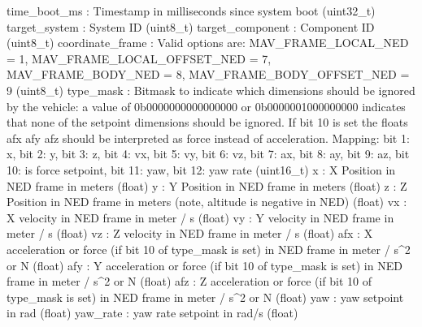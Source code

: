 \begin{DoxyVerb}
\begin{DoxyVerb}
\begin{DoxyVerb}
\begin{DoxyVerb}
\begin{DoxyVerb}
\begin{DoxyVerb}
\begin{DoxyVerb}
\begin{DoxyVerb}
\begin{DoxyVerb}
\begin{DoxyVerb}
\begin{DoxyVerb}
time_boot_ms              : Timestamp in milliseconds since system boot (uint32_t)
target_system             : System ID (uint8_t)
target_component          : Component ID (uint8_t)
coordinate_frame          : Valid options are: MAV_FRAME_LOCAL_NED = 1, MAV_FRAME_LOCAL_OFFSET_NED = 7, MAV_FRAME_BODY_NED = 8, MAV_FRAME_BODY_OFFSET_NED = 9 (uint8_t)
type_mask                 : Bitmask to indicate which dimensions should be ignored by the vehicle: a value of 0b0000000000000000 or 0b0000001000000000 indicates that none of the setpoint dimensions should be ignored. If bit 10 is set the floats afx afy afz should be interpreted as force instead of acceleration. Mapping: bit 1: x, bit 2: y, bit 3: z, bit 4: vx, bit 5: vy, bit 6: vz, bit 7: ax, bit 8: ay, bit 9: az, bit 10: is force setpoint, bit 11: yaw, bit 12: yaw rate (uint16_t)
x                         : X Position in NED frame in meters (float)
y                         : Y Position in NED frame in meters (float)
z                         : Z Position in NED frame in meters (note, altitude is negative in NED) (float)
vx                        : X velocity in NED frame in meter / s (float)
vy                        : Y velocity in NED frame in meter / s (float)
vz                        : Z velocity in NED frame in meter / s (float)
afx                       : X acceleration or force (if bit 10 of type_mask is set) in NED frame in meter / s^2 or N (float)
afy                       : Y acceleration or force (if bit 10 of type_mask is set) in NED frame in meter / s^2 or N (float)
afz                       : Z acceleration or force (if bit 10 of type_mask is set) in NED frame in meter / s^2 or N (float)
yaw                       : yaw setpoint in rad (float)
yaw_rate                  : yaw rate setpoint in rad/s (float)\end{DoxyVerb}
 \mbox{\label{classpymavlink_1_1dialects_1_1v10_1_1MAVLink_a85b72243d402ef88754cd781cf5fcf24}} 

\end{DoxyVerb}
\end{DoxyVerb}
\end{DoxyVerb}
\end{DoxyVerb}
\end{DoxyVerb}
\end{DoxyVerb}
\end{DoxyVerb}
\end{DoxyVerb}
\end{DoxyVerb}
\end{DoxyVerb}
